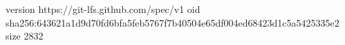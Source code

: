version https://git-lfs.github.com/spec/v1
oid sha256:643621a1d9d70fd6bfa5feb5767f7b40504e65df004ed68423d1c5a5425335e2
size 2832
